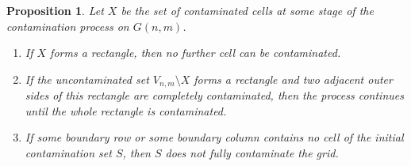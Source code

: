 \documentclass[letterpaper,12pt]{article}
\newtheorem{proposition}{Proposition}
\begin{document}
 
\begin{proposition}\label{prop:rectangular-boundary}
Let $X$ be the set of contaminated cells at some stage of the contamination process on $G(n,m)$.

\begin{enumerate}
    \item[\textup{(A)}] If $X$ forms a rectangle, then no further cell can be contaminated.

    \item[\textup{(B)}] If the uncontaminated set $V_{n,m}\setminus X$ forms a rectangle and two adjacent outer
    sides of this rectangle are completely contaminated, then the process continues until the whole
    rectangle is contaminated.

    \item[\textup{(C)}] If some boundary row or some boundary column contains no cell of the initial contamination
    set $S$, then $S$ does not fully contaminate the grid.
\end{enumerate}
\end{proposition}
\end{document}
